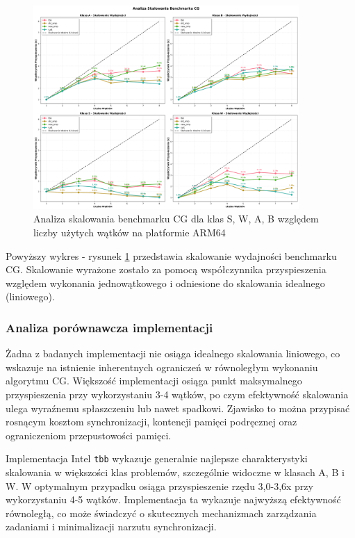 \begin{figure}[H]
    \centering
    \includegraphics[width=0.9\textwidth]{analiza/images/parallel/cg/arm/cg_analiza_skalowania.png}
    \caption{Analiza skalowania benchmarku CG dla klas S, W, A, B względem liczby użytych wątków na platformie ARM64}
    \label{cg_analiza_skalowania}
\end{figure}
Powyższy wykres - rysunek \ref{cg_analiza_skalowania} przedstawia skalowanie wydajności benchmarku CG. Skalowanie wyrażone zostało za pomocą współczynnika przyspieszenia względem wykonania jednowątkowego i odniesione do skalowania idealnego (liniowego).

\subsubsection{Analiza porównawcza implementacji}
Żadna z badanych implementacji nie osiąga idealnego skalowania liniowego, co wskazuje na istnienie inherentnych ograniczeń w równoległym wykonaniu algorytmu CG. Większość implementacji osiąga punkt maksymalnego przyspieszenia przy wykorzystaniu 3-4 wątków, po czym efektywność skalowania ulega wyraźnemu spłaszczeniu lub nawet spadkowi. Zjawisko to można przypisać rosnącym kosztom synchronizacji, kontencji pamięci podręcznej oraz ograniczeniom przepustowości pamięci.

Implementacja Intel \texttt{tbb} wykazuje generalnie najlepsze charakterystyki skalowania w większości klas problemów, szczególnie widoczne w klasach A, B i W. W optymalnym przypadku osiąga przyspieszenie rzędu 3,0-3,6x przy wykorzystaniu 4-5 wątków. Implementacja ta wykazuje najwyższą efektywność równoległą, co może świadczyć o skutecznych mechanizmach zarządzania zadaniami i minimalizacji narzutu synchronizacji.

